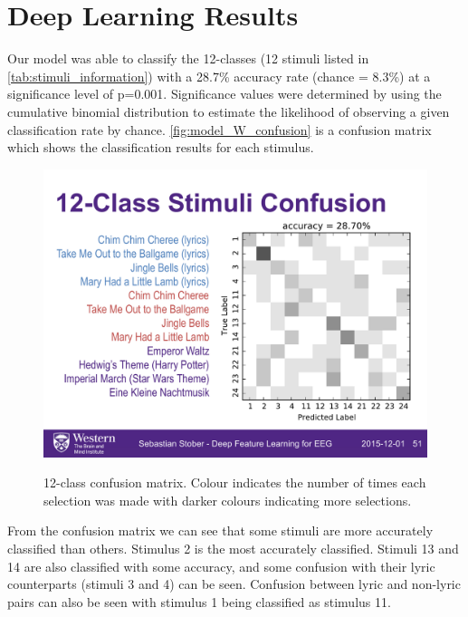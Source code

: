 \section*{Deep Learning Results}
Our model was able to classify the 12-classes (12 stimuli listed in \autoref{tab:stimuli_information}) with a 28.7\% accuracy rate (chance = 8.3\%) at a significance level of p=0.001. 
Significance values were determined by using the cumulative binomial distribution to estimate the likelihood of observing a given classification rate by chance. 
\autoref{fig:model_W_confusion} is a confusion matrix which shows the classification results for each stimulus.

\begin{figure}[h] 
  \begin{center}
    \includegraphics[width=.75\textwidth,keepaspectratio=true]{Figures/model_W_confusion}
   \\\vspace{-0.8em}
    \caption{12-class confusion matrix. Colour indicates the number of times each selection was made with darker colours indicating more selections.}
    \label{fig:model_W_confusion}
  \end{center}
\end{figure}

From the confusion matrix we can see that some stimuli are more accurately classified than others. 
Stimulus 2 is the most accurately classified. 
Stimuli 13 and 14 are also classified with some accuracy, and some confusion with their lyric counterparts (stimuli 3 and 4) can be seen.
Confusion between lyric and non-lyric pairs can also be seen with stimulus 1 being classified as stimulus 11.

